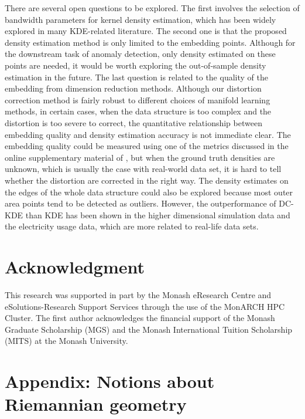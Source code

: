 \documentclass[11pt,a4paper,]{article}
\begin{document}
There are several open questions to be explored. The first involves the selection of bandwidth parameters for kernel density estimation, which has been widely explored in many KDE-related literature. The second one is that the proposed density estimation method is only limited to the embedding points. Although for the downstream task of anomaly detection, only density estimated on these points are needed, it would be worth exploring the out-of-sample density estimation in the future.
The last question is related to the quality of the embedding from dimension reduction methods. Although our distortion correction method is fairly robust to different choices of manifold learning methods, in certain cases, when the data structure is too complex and the distortion is too severe to correct, the quantitative relationship between embedding quality and density estimation accuracy is not immediate clear. The embedding quality could be measured using one of the metrics discussed in the online supplementary material of \textcite{Cheng2021-dh}, but when the ground truth densities are unknown, which is usually the case with real-world data set, it is hard to tell whether the distortion are corrected in the right way. The density estimates on the edges of the whole data structure could also be explored because most outer area points tend to be detected as outliers. However, the outperformance of DC-KDE than KDE has been shown in the higher dimensional simulation data and the electricity usage data, which are more related to real-life data sets.

\hypertarget{acknowledgment}{%
\section*{Acknowledgment}\label{acknowledgment}}

This research was supported in part by the Monash eResearch Centre and eSolutions-Research Support Services through the use of the MonARCH HPC Cluster. The first author acknowledges the financial support of the Monash Graduate Scholarship (MGS) and the Monash International Tuition Scholarship (MITS) at the Monash University.

\appendix

\hypertarget{riemgeo}{%
\section{Appendix: Notions about Riemannian geometry}\label{riemgeo}}
\end{document}
